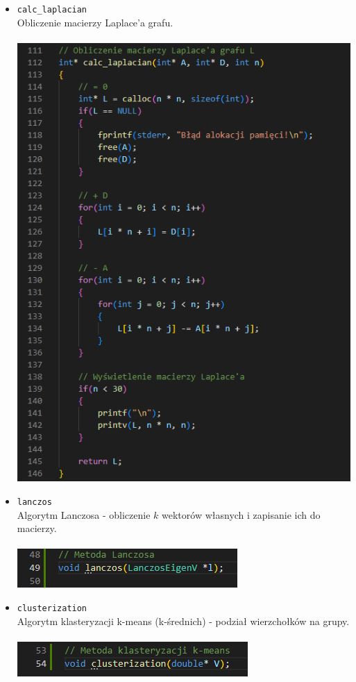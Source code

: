 \documentclass{article}
\begin{document}
\begin{itemize}
        \item \texttt{calc\_laplacian} \\
        Obliczenie macierzy Laplace'a grafu. \\\\
        \includegraphics[width=0.825\linewidth, center]{img/calc_laplacian.png}
        
        \item \texttt{lanczos} \\
        Algorytm Lanczosa - obliczenie \(k\) wektorów własnych i zapisanie ich do macierzy. \\\\
        \includegraphics[width=0.825\linewidth, center]{img/lanczos.png}
        
        \item \texttt{clusterization} \\
        Algorytm klasteryzacji k-means (k-średnich) - podział wierzchołków na grupy. \\\\
        \includegraphics[width=0.825\linewidth, center]{img/clusterization.png}
        

\end{itemize}
\end{document}
